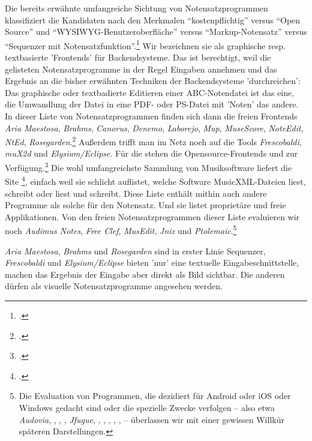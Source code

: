 Die bereits erwähnte umfangreiche Sichtung von Notensatzprogrammen klassifiziert
die Kandidaten nach den Merkmalen \enquote{kostenpflichtig} versus \enquote{Open
Source} und \enquote{WYSIWYG-Benutzeroberfläche} versus
\enquote{Markup-Notensatz} versus \enquote{Sequenzer mit
Notensatzfunktion}.\footcite[vgl.][\nopage wp]{WpedNotensatz2019a} Wir
bezeichnen sie als graphische resp. textbasierte 'Frontends' für
Backendsysteme. Das ist berechtigt, weil die gelisteten Notensatzprogramme in
der Regel Eingaben annehmen und das Ergebnis an die bisher erwähnten Techniken
der Backendsysteme 'durchreichen': Das graphische oder textbadierte Editieren
einer ABC-Notendatei ist das eine, die Umwandlung der Datei in eine PDF- oder
PS-Datei mit 'Noten' das andere. In dieser Liste von Notensatzprogrammen finden
sich dann die freien Frontends \textit{Aria Maestosa}, \textit{Brahms},
\textit{Canorus}, \textit{Denemo}, \textit{Laborejo}, \textit{Mup},
\textit{MuseScore}, \textit{NoteEdit}, \textit{NtEd},
\textit{Rosegarden}.\footcite[vgl.][\nopage wp]{WpedNotensatz2019a} Außerdem
trifft man im Netz noch auf die Tools \textit{Frescobaldi}, \textit{muX2d} und
\textit{Elysium/Eclipse}. Für die  stehen die
Opensource-Frontends  und  zur
Verfügung.\footcite[vgl.][\nopage wp]{Abc2018b} Die wohl umfangreichste Sammlung
von Musiksoftware liefert die Site \footcite[vgl.][\nopage
wp]{MusicXML2018b}, einfach weil sie schlicht auflistet, welche Software
MusicXML-Dateien liest, schreibt oder liest und schreibt. Diese Liste enthält
mithin auch andere Programme als solche für den Notensatz. Und sie listet
proprietäre und freie Applikationen. Von den freien Notensatzprogrammen dieser
Liste evaluieren wir noch \textit{Audimus Notes}, \textit{Free Clef},
\textit{MusEdit}, \textit{Jniz} und \textit{Ptolemaic}.\footnote{Die Evaluation
von Programmen, die dezidiert für Android oder iOS oder Windows gedacht sind
oder die spezielle Zwecke verfolgen -- also etwa \textit{Audovia},
, , , \textit{Jfugue}, ,
, , , ,  -- überlassen wir mit einer gewissen Willkür
späteren Darstellungen.}


\textit{Aria Maestosa}, \textit{Brahms} und \textit{Rosegarden}
sind in erster Linie \textsf{Sequenzer}, \textit{Frescobaldi} und
\textit{Elysium/Eclipse} bieten 'nur' eine textuelle Eingabeschnittstelle,
machen das Ergebnis der Eingabe aber direkt als Bild sichtbar. Die anderen
dürfen als visuelle Notensatzprogramme angesehen werden.

